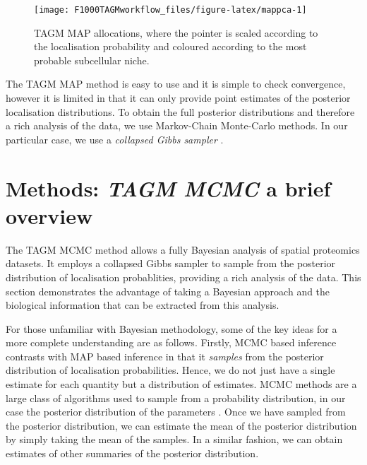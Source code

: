 \documentclass[9pt,a4paper,]{extarticle}
\begin{document}
\begin{figure}

{\centering \texttt{[image: F1000TAGMworkflow\_files/figure-latex/mappca-1]} 

}

\caption{TAGM MAP allocations, where the pointer is scaled according to the localisation probability and coloured according to the most probable subcellular niche.}\label{fig:mappca}
\end{figure}

The TAGM MAP method is easy to use and it is simple to check
convergence, however it is limited in that it can only provide point
estimates of the posterior localisation distributions. To obtain the
full posterior distributions and therefore a rich analysis of the
data, we use Markov-Chain Monte-Carlo methods. In our
particular case, we use a \emph{collapsed Gibbs sampler}
\citep{Smith:1993}.

\hypertarget{methods-tagm-mcmc-a-brief-overview}{%
\section{\texorpdfstring{Methods: \emph{TAGM MCMC} a brief overview}{Methods: TAGM MCMC a brief overview}}\label{methods-tagm-mcmc-a-brief-overview}}

The TAGM MCMC method allows a fully Bayesian analysis of spatial
proteomics datasets. It employs a collapsed Gibbs sampler to
sample from the posterior distribution of localisation probablities,
providing a rich analysis of the data. This section demonstrates the
advantage of taking a Bayesian approach and the biological information
that can be extracted from this analysis.

For those unfamiliar with Bayesian methodology,
some of the key ideas for a more complete
understanding are as follows. Firstly, MCMC based inference contrasts with MAP based
inference in that it \textit{samples} from the posterior
distribution of localisation probabilities. Hence, we do not just have
a single estimate for each quantity but a distribution of
estimates. MCMC methods are a large class of algorithms used to sample
from a probability distribution, in our case the posterior
distribution of the parameters \citep{Gilks:1995}. Once we have sampled from the posterior
distribution, we can estimate the mean of the posterior
distribution by simply taking the mean of the samples. In a similar
fashion, we can obtain estimates of other summaries of the posterior distribution.
\end{document}
